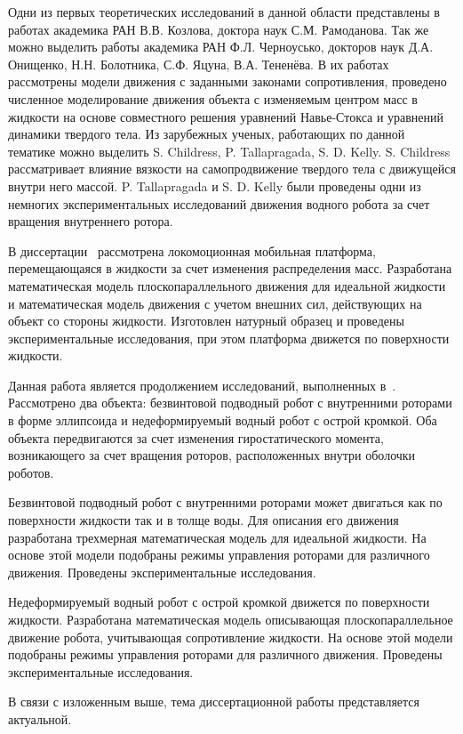 Одни из первых теоретических исследований в данной области представлены в работах академика РАН В.В. Козлова, доктора наук С.М. Рамоданова. Так же можно выделить работы академика РАН Ф.Л. Черноусько, докторов наук Д.А. Онищенко, Н.Н. Болотника, С.Ф. Яцуна, В.А. Тененёва. В их работах рассмотрены модели движения с заданными законами сопротивления, проведено численное моделирование движения объекта с изменяемым центром масс в жидкости на основе совместного решения уравнений Навье-Стокса и уравнений динамики твердого тела. Из зарубежных ученых, работающих по данной тематике можно выделить S. Childress, P. Tallapragada, S. D. Kelly. S. Childress рассматривает влияние вязкости на самопродвижение твердого тела с движущейся внутри него массой. P. Tallapragada и S. D. Kelly были проведены одни из немногих экспериментальных исследований движения водного робота за счет вращения внутреннего ротора.

В диссертации~\cite{Klenov_diss} рассмотрена локомоционная мобильная платформа, перемещающаяся в жидкости за счет изменения распределения масс. Разработана математическая модель плоскопараллельного движения для идеальной жидкости и математическая модель движения с учетом внешних сил, действующих на объект со стороны жидкости. Изготовлен натурный образец и проведены экспериментальные исследования, при этом платформа движется по поверхности жидкости.

Данная работа является продолжением исследований, выполненных в~\cite{Klenov_diss}. Рассмотрено два объекта: безвинтовой подводный робот с внутренними роторами в форме эллипсоида и недеформируемый водный робот с острой кромкой. Оба объекта передвигаются за счет изменения гиростатического момента, возникающего за счет вращения роторов, расположенных внутри оболочки роботов.
 
Безвинтовой подводный робот с внутренними роторами может двигаться как по поверхности жидкости так и в толще воды. Для описания его движения разработана трехмерная математическая модель для идеальной жидкости. На основе этой модели подобраны режимы управления роторами для различного движения. Проведены экспериментальные исследования.

Недеформируемый водный робот с острой кромкой движется по поверхности жидкости. Разработана математическая модель описывающая плоскопараллельное движение робота, учитывающая сопротивление жидкости. На основе этой модели подобраны режимы управления роторами для различного движения. Проведены экспериментальные исследования.


В связи с изложенным выше, тема диссертационной работы представляется актуальной.




